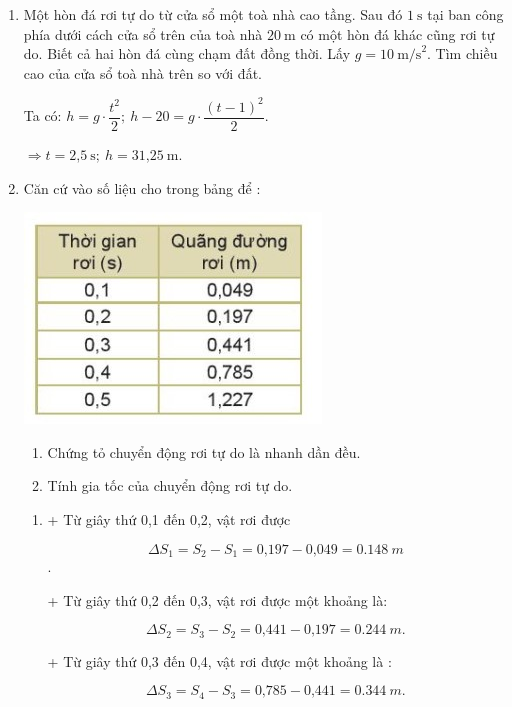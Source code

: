 \begin{enumerate}[label=\bfseries Bài \arabic*:,leftmargin=1.5cm]
	\item {}
	
	
	{
		Một hòn đá rơi tự do từ cửa sổ một toà nhà cao tầng. Sau đó $1\ \text{s}$ tại ban công phía dưới cách cửa sổ trên của toà nhà $20\ \text{m}$ có một hòn đá khác cũng rơi tự do. Biết cả hai hòn đá cùng chạm đất đồng thời. Lấy $g=10\ \text{m/s}^2$. Tìm chiều cao của cửa sổ toà nhà trên so với đất.	
	}
	\hideall
	{	
		
		Ta có: $h=g\cdot \dfrac{t^2}{2}; \ h-20=g\cdot \dfrac{\left(t-1 \right)^2 }{2}$.
		
		$\Rightarrow t=\text{2,5}\ \text{s}; \ h=\text{31,25}\ \text{m}$.  
	}
	
	
	\item {}
	
	
	{
		Căn cứ vào số liệu cho trong bảng để :
		\begin{center}
			\includegraphics[scale=1]{../figs/VN10-2022-PH-TP013-1.jpg}
		\end{center}
		\begin{enumerate}[label=\alph*)]
			\item Chứng tỏ chuyển động rơi tự do là nhanh dần đều. 
			\item Tính gia tốc của chuyển động rơi tự do.
		\end{enumerate}
	}
	\hideall
	{	
		\begin{enumerate}[label=\alph*)]
			\item 
			+ Từ giây thứ 0,1 đến 0,2, vật rơi được
			
			$$\Delta S_1 = S_2 -  S_1=\text{0,197} - \text{0,049} = \SI{0,148}{m}$$.
			
			+ Từ giây thứ 0,2 đến 0,3, vật rơi được một khoảng là: 
			
			$$\Delta S_2 = S_3 -  S_2= \text{0,441} - \text{0,197}= \SI{0,244}{m}.$$
			
			+ Từ giây thứ 0,3 đến 0,4, vật rơi được một khoảng là :
			
			$$\Delta S_3= S_4 - S_3= \text{0,785} - \text{0,441}= \SI{0,344}{m}.$$
			

\end{enumerate}}
\end{enumerate}

